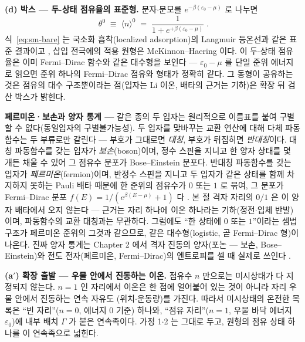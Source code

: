 \textbf{(d) 박스 --- 두-상태 점유율의 표준형.} 분자$\cdot$분모를 $e^{-\beta(\varepsilon_0-\mu)}$ 로 나누면
\begin{equation}
\boxed{\;\theta^{0}\;\equiv\;\langle n\rangle^{0}\;=\;\frac{1}{1+e^{+\beta(\varepsilon_0-\mu)}}\;.}
\label{eq:sm-bare}
\end{equation}
식~\eqref{eq:sm-bare} 는 국소화 흡착(localized adsorption)의 Langmuir 등온선과 같은 표준 결과이고
\cite{hill1960,fowler1939}, 삽입 전극에의 적용 원형은 McKinnon--Haering \cite{mckinnon1983} 이다. 이
두-상태 점유율은 이미 Fermi--Dirac 함수와 같은 대수형을 보인다 --- $\varepsilon_0-\mu$ 를 단일 준위 에너지로
읽으면 준위 하나의 Fermi--Dirac 점유와 형태가 정확히 같다. 그 동형이 공유하는 것은 점유의 대수 구조뿐이라는
점(입자는 Li 이온, 배타의 근거는 기하)은 확장 뒤 검산 박스가 밝힌다.

\begin{bgbox}
\textbf{페르미온·보손과 양자 통계 ---} 같은 종의 두 입자는 원리적으로 이름표를 붙여 구별할 수 없다(동일입자의
구별불가능성). 두 입자를 맞바꾸는 교환 연산에 대해 다체 파동함수는 두 부류로만 갈린다 --- 부호가 그대로면
\emph{대칭}, 부호가 뒤집히면 \emph{반대칭}이다. 대칭 파동함수를 갖는 입자가 \emph{보손}(boson)이며, 정수
스핀을 지니고 한 양자 상태를 몇 개든 채울 수 있어 그 점유수 분포가 Bose--Einstein 분포다. 반대칭 파동함수를
갖는 입자가 \emph{페르미온}(fermion)이며, 반정수 스핀을 지니고 두 입자가 같은 상태를 함께 차지하지 못하는
Pauli 배타 때문에 한 준위의 점유수가 $0$ 또는 $1$ 로 묶여, 그 분포가 Fermi--Dirac 분포
$f(E)=1/(e^{\beta(E-\mu)}+1)$ 다 \cite{mcquarrie1976}. 본 절 격자 자리의 $0/1$ 은 이 양자 배타에서 오지
않는다 --- 근거는 자리 하나에 이온 하나라는 기하(정전$\cdot$입체 반발)이며, 파동함수의 교환 대칭과는 무관하다.
그럼에도 ``한 상태에 $0$ 또는 $1$''이라는 셈법 구조가 페르미온 준위의 그것과 같으므로, 같은 대수형(logistic,
곧 Fermi--Dirac 형)이 나온다. 진짜 양자 통계는 Chapter 2 에서 격자 진동의 양자(포논 --- 보손,
Bose--Einstein)와 전도 전자(페르미온, Fermi--Dirac)의 엔트로피를 셀 때 실제로 쓰인다
\cite{ashcroftmermin1976}.
\end{bgbox}

\textbf{(a$'$) 확장 출발 --- 우물 안에서 진동하는 이온.} 점유수 $n$ 만으로는 미시상태가 다 지정되지 않는다.
$n=1$ 인 자리에서 이온은 한 점에 얼어붙어 있는 것이 아니라 자리 우물 안에서 진동하는 연속 자유도
(위치$\cdot$운동량)를 가진다. 따라서 미시상태의 온전한 목록은 ``빈 자리''($n=0$, 에너지 $0$ 기준) 하나와,
``점유 자리''($n=1$, 우물 바닥 에너지 $\varepsilon_0$)에 내부 배치 $\Gamma$ 가 붙은 연속족이다. 가정 1$\cdot$2
는 그대로 두고, 원형의 점유 상태 하나를 이 연속족으로 넓힌다.

